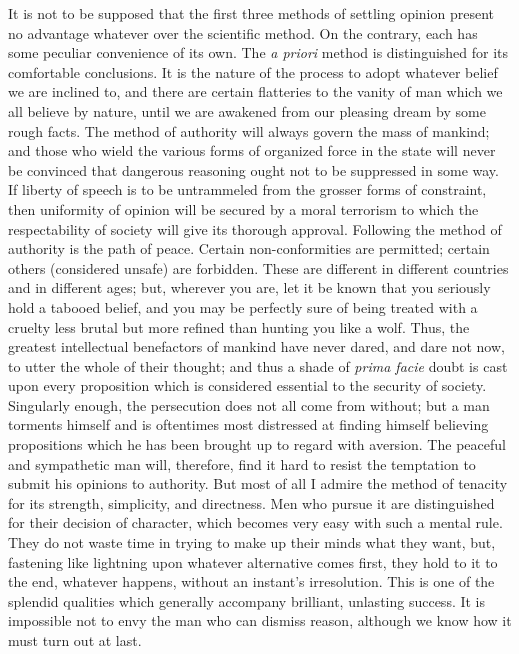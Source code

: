 \documentclass[]{article}
\begin{document}
It is not to be supposed that the first three methods of settling opinion present no advantage whatever over the scientific method. On the contrary, each has some peculiar convenience of its own. The \emph{a priori} method is distinguished for its comfortable conclusions. It is the nature of the process to adopt whatever belief we are inclined to, and there are certain flatteries to the vanity of man which we all believe by nature, until we are awakened from our pleasing dream by some rough facts. The method of authority will always govern the mass of mankind; and those who wield the various forms of organized force in the state will never be convinced that dangerous reasoning ought not to be suppressed in some way. If liberty of speech is to be untrammeled from the grosser forms of constraint, then uniformity of opinion will be secured by a moral terrorism to which the respectability of society will give its thorough approval. Following the method of authority is the path of peace. Certain non-conformities are permitted; certain others (considered unsafe) are forbidden. These are different in different countries and in different ages; but, wherever you are, let it be known that you seriously hold a tabooed belief, and you may be perfectly sure of being treated with a cruelty less brutal but more refined than hunting you like a wolf. Thus, the greatest intellectual benefactors of mankind have never dared, and dare not now, to utter the whole of their thought; and thus a shade of \emph{prima facie} doubt is cast upon every proposition which is considered essential to the security of society. Singularly enough, the persecution does not all come from without; but a man torments himself and is oftentimes most distressed at finding himself believing propositions which he has been brought up to regard with aversion. The peaceful and sympathetic man will, therefore, find it hard to resist the temptation to submit his opinions to authority. But most of all I admire the method of tenacity for its strength, simplicity, and directness. Men who pursue it are distinguished for their decision of character, which becomes very easy with such a mental rule. They do not waste time in trying to make up their minds what they want, but, fastening like lightning upon whatever alternative comes first, they hold to it to the end, whatever happens, without an instant's irresolution. This is one of the splendid qualities which generally accompany brilliant, unlasting success. It is impossible not to envy the man who can dismiss reason, although we know how it must turn out at last.
\end{document}
